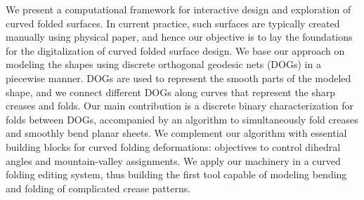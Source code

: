 We present a computational framework for interactive design and exploration of curved folded surfaces. In current practice, such surfaces are typically created manually using physical paper, and hence our objective is to lay the foundations for the digitalization of curved folded surface design.
We base our approach on modeling the shapes using discrete orthogonal geodesic nets (DOGs) in a piecewise manner. DOGs are used to represent the smooth parts of the modeled shape, and we connect different DOGs along curves that represent the sharp creases and folds. 
Our main 
contribution is a discrete binary characterization for folds between DOGs, accompanied by an algorithm to simultaneously fold creases and smoothly bend planar sheets. We complement our algorithm with essential building blocks for curved folding deformations: objectives to control dihedral angles and mountain-valley assignments. We apply our machinery in a curved folding editing system, thus building the first tool capable of modeling bending and folding of complicated crease patterns.


